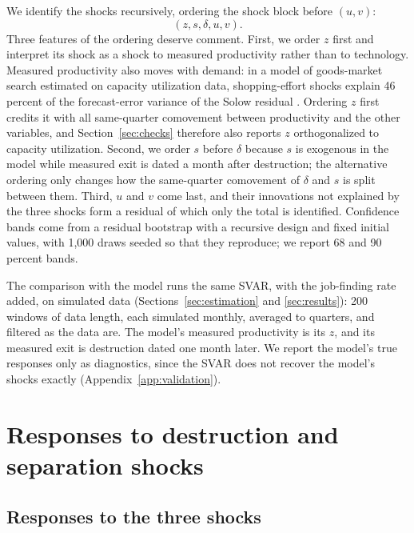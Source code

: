 \documentclass[authoryear, review, 12pt]{elsarticle}
\begin{document}
We identify the shocks recursively, ordering the shock block before $(u, v)$:
\begin{equation}
(z, s, \delta, u, v).
\end{equation}
Three features of the ordering deserve comment. First, we order $z$ first and interpret its shock as a shock to measured productivity rather than to technology. Measured productivity also moves with demand: in a model of goods-market search estimated on capacity utilization data, shopping-effort shocks explain 46 percent of the forecast-error variance of the Solow residual \citep[Table 4]{silva_urias_2025}. Ordering $z$ first credits it with all same-quarter comovement between productivity and the other variables, and Section~\ref{sec:checks} therefore also reports $z$ orthogonalized to capacity utilization. Second, we order $s$ before $\delta$ because $s$ is exogenous in the model while measured exit is dated a month after destruction; the alternative ordering only changes how the same-quarter comovement of $\delta$ and $s$ is split between them. Third, $u$ and $v$ come last, and their innovations not explained by the three shocks form a residual of which only the total is identified. Confidence bands come from a residual bootstrap with a recursive design and fixed initial values, with 1,000 draws seeded so that they reproduce; we report 68 and 90 percent bands.

The comparison with the model runs the same SVAR, with the job-finding rate added, on simulated data (Sections~\ref{sec:estimation} and \ref{sec:results}): 200 windows of data length, each simulated monthly, averaged to quarters, and filtered as the data are. The model's measured productivity is its $z$, and its measured exit is destruction dated one month later. We report the model's true responses only as diagnostics, since the SVAR does not recover the model's shocks exactly (Appendix~\ref{app:validation}).

\section{Responses to destruction and separation shocks}\label{sec:facts}

\subsection{Responses to the three shocks}
\end{document}
